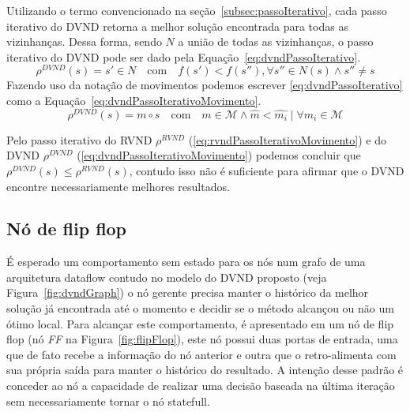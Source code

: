 Utilizando o termo convencionado na seção~\ref{subsec:passoIterativo}, cada passo iterativo do DVND retorna a melhor solução encontrada para todas as vizinhanças.
Dessa forma, sendo $N$ a união de todas as vizinhanças, o passo iterativo do DVND pode ser dado pela Equação~\ref{eq:dvndPassoIterativo}.
\begin{equation} \label{eq:dvndPassoIterativo}
\rho^{DVND}(s) = s' \in N \quad \textrm{com} \quad f(s') < f(s''), \forall s'' \in N(s) \land s'' \ne s
\end{equation}
Fazendo uso da notação de movimentos podemos escrever \ref{eq:dvndPassoIterativo} como a Equação~\ref{eq:dvndPassoIterativoMovimento}.
\begin{equation} \label{eq:dvndPassoIterativoMovimento}
\rho^{DVND}(s) = m \circ s\quad \textrm{com} \quad m \in \mathcal{M} \land \widehat{m} < \widehat{m_i} \mid \forall m_i \in \mathcal{M}
\end{equation}

Pelo passo iterativo do RVND $\rho^{RVND}$ (\ref{eq:rvndPassoIterativoMovimento}) e do DVND $\rho^{DVND}$ (\ref{eq:dvndPassoIterativoMovimento}) podemos concluir que $\rho^{DVND}(s) \le \rho^{RVND}(s)$, contudo isso não é suficiente para afirmar que o DVND encontre necessariamente melhores resultados.%

\subsection{Nó de flip flop}\label{subsec:flipFlop}

É esperado um comportamento sem estado para os nós num grafo de uma arquitetura dataflow contudo no modelo do DVND proposto (veja Figura~\ref{fig:dvndGraph}) o nó gerente precisa manter o histórico da melhor solução já encontrada até o momento e decidir se o método alcançou ou não um ótimo local. Para alcançar este comportamento, é apresentado em \cite{endm2018:araujo} um nó de flip flop \label{text:flipFlop} (nó \textit{FF} na Figura~\ref{fig:flipFlop}), este nó possui duas portas de entrada, uma que de fato recebe a informação do nó anterior e outra que o retro-alimenta com sua própria saída para manter o histórico do resultado. A intenção desse padrão é conceder ao nó a capacidade de realizar uma decisão baseada na última iteração sem necessariamente tornar o nó statefull.

